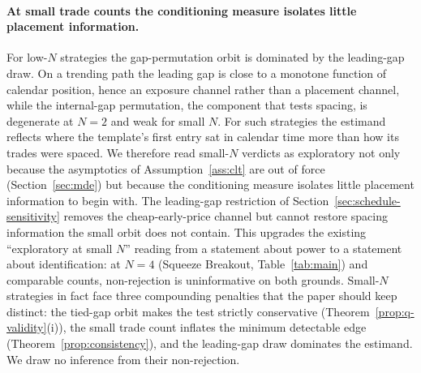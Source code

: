 \documentclass[preprint,12pt]{elsarticle}
\theoremstyle{definition}
\begin{document}
\paragraph{At small trade counts the conditioning measure isolates little placement
information.} For low-$N$ strategies the gap-permutation orbit is dominated by the
leading-gap draw. On a trending path the leading gap is close to a monotone function
of calendar position, hence an exposure channel rather than a placement channel, while
the internal-gap permutation, the component that tests spacing, is degenerate at $N=2$
and weak for small $N$. For such strategies the estimand reflects where the template's
first entry sat in calendar time more than how its trades were spaced. We therefore
read small-$N$ verdicts as exploratory not only because the asymptotics of
Assumption~\ref{ass:clt} are out of force (Section~\ref{sec:mde}) but because the
conditioning measure isolates little placement information to begin with. The
leading-gap restriction of Section~\ref{sec:schedule-sensitivity} removes the
cheap-early-price channel but cannot restore spacing information the small orbit does
not contain. This upgrades the existing ``exploratory at small $N$'' reading from a
statement about power to a statement about identification: at $N=4$ (Squeeze Breakout,
Table~\ref{tab:main}) and comparable counts, non-rejection is uninformative on both
grounds. Small-$N$ strategies in fact face three compounding penalties that the paper
should keep distinct: the tied-gap orbit makes the test strictly conservative
(Theorem~\ref{prop:q-validity}(i)), the small trade count inflates the minimum
detectable edge (Theorem~\ref{prop:consistency}), and the leading-gap draw
dominates the estimand. We draw no inference from their non-rejection.
\end{document}
